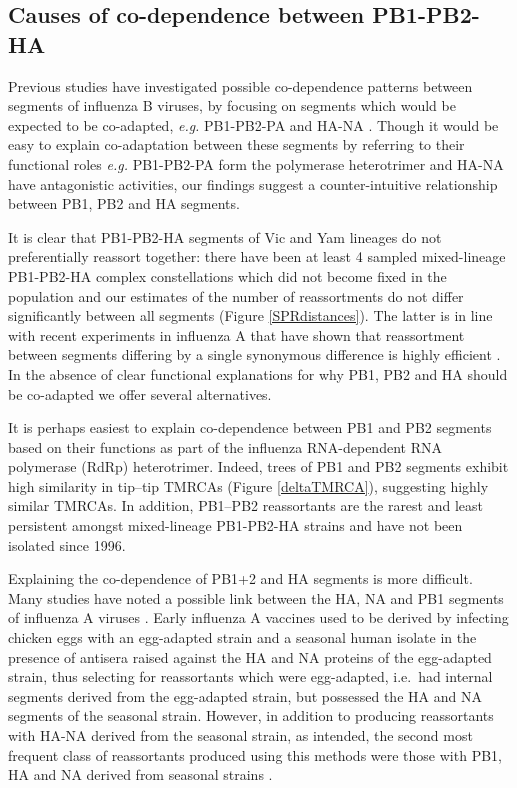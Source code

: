 \documentclass[11pt,oneside,letterpaper]{article}
\begin{document}
\subsection*{Causes of co-dependence between PB1-PB2-HA}
Previous studies have investigated possible co-dependence patterns between segments of influenza B viruses, by focusing on segments which would be expected to be co-adapted, \textit{e.g.} PB1-PB2-PA and HA-NA \cite{mccullers2004}.
Though it would be easy to explain co-adaptation between these segments by referring to their functional roles \textit{e.g.} PB1-PB2-PA form the polymerase heterotrimer and HA-NA have antagonistic activities, our findings suggest a counter-intuitive relationship between PB1, PB2 and HA segments.

It is clear that PB1-PB2-HA segments of Vic and Yam lineages do not preferentially reassort together: there have been at least 4 sampled mixed-lineage PB1-PB2-HA complex constellations which did not become fixed in the population and our estimates of the number of reassortments do not differ significantly between all segments (Figure \ref{SPRdistances}).
The latter is in line with recent experiments in influenza A that have shown that reassortment between segments differing by a single synonymous difference is highly efficient \cite{marshall2013}.
In the absence of clear functional explanations for why PB1, PB2 and HA should be co-adapted we offer several alternatives.

It is perhaps easiest to explain co-dependence between PB1 and PB2 segments based on their functions as part of the influenza RNA-dependent RNA polymerase (RdRp) heterotrimer.
Indeed, trees of PB1 and PB2 segments exhibit high similarity in tip--tip TMRCAs (Figure \ref{deltaTMRCA}), suggesting highly similar TMRCAs.
In addition, PB1--PB2 reassortants are the rarest and least persistent amongst mixed-lineage PB1-PB2-HA strains and have not been isolated since 1996.

Explaining the co-dependence of PB1+2 and HA segments is more difficult.
Many studies have noted a possible link between the HA, NA and PB1 segments of influenza A viruses \cite{bergeron2010,fulvini2011}.
Early influenza A vaccines used to be derived by infecting chicken eggs with an egg-adapted strain and a seasonal human isolate in the presence of antisera raised against the HA and NA proteins of the egg-adapted strain, thus selecting for reassortants which were egg-adapted, i.e.\ had internal segments derived from the egg-adapted strain, but possessed the HA and NA segments of the seasonal strain.
However, in addition to producing reassortants with HA-NA derived from the seasonal strain, as intended, the second most frequent class of reassortants produced using this methods were those with PB1, HA and NA derived from seasonal strains \cite{bergeron2010,fulvini2011}.
\end{document}
